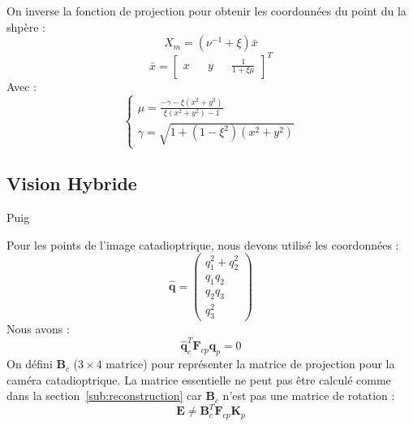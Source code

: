 On inverse la fonction de projection pour obtenir les coordonnées du point du la shpère :
\begin{equation}
X_m = (\nu^{-1} + \xi) \bar{x}
\end{equation}
\begin{equation}
\bar{x} = \begin{bmatrix}x && y && \frac{1}{1+\xi \mu} \end{bmatrix}^{T}
\end{equation}
Avec :
\begin{equation}
  \left \{
  \begin{matrix}
    \mu = \frac{-\gamma-\xi(x^2+y^2)}{\xi(x^2+y^2)-1} \\
    \gamma = \sqrt{1+(1-\xi^2)(x^2+y^2)}
  \end{matrix}
 \right.
\end{equation}



\subsection{Vision Hybride}
Puig \cite{Puig08}

Pour les points de l'image catadioptrique, nous devons utilisé les coordonnées \cite{lifted}:
$$\hat{\mathbf{q}}=\begin{pmatrix}q_1^2+q_2^2\\q_1q_2\\q_2q_3\\q_3^2\end{pmatrix}$$
Nous avons :
\begin{equation}
\hat{\mathbf{q}}_c^T\mathbf{F}_{cp}\mathbf{q}_p=0
\end{equation}
On défini $\mathbf{B}_c$ ($3\times4$ matrice) pour représenter la matrice de projection pour la caméra catadioptrique.
La matrice essentielle ne peut pas \^etre calculé comme dans la section~\ref{sub:reconstruction} car $\mathbf{B}_c$ n'est pas une matrice de rotation :
\begin{equation}
\mathbf{E} \neq \mathbf{B}_c^T \mathbf{F}_{cp} \mathbf{K}_p
\end{equation}
